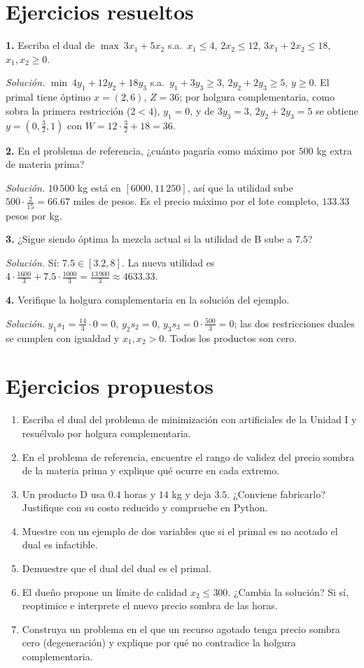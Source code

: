 \documentclass[a4paper,11pt]{article}
\theoremstyle{plain}
\theoremstyle{definition}
\newcommand{\fr}[2]{\tfrac{#1}{#2}}
\begin{document}
\section{Ejercicios resueltos}

\textbf{1.} Escriba el dual de $\max\ 3x_1+5x_2$ s.a.\ $x_1\le4$, $2x_2\le12$, $3x_1+2x_2\le18$, $x_1,x_2\ge0$.

\emph{Solución.} $\min\ 4y_1+12y_2+18y_3$ s.a.\ $y_1+3y_3\ge3$, $2y_2+2y_3\ge5$, $y\ge0$. El primal tiene
óptimo $x=(2,6)$, $Z=36$; por holgura complementaria, como sobra la primera restricción ($2<4$), $y_1=0$, y
de $3y_3=3$, $2y_2+2y_3=5$ se obtiene $y=(0,\fr32,1)$ con $W=12\cdot\fr32+18=36$.

\textbf{2.} En el problema de referencia, ¿cuánto pagaría como máximo por $500$ kg extra de materia prima?

\emph{Solución.} $10\,500$ kg está en $[6000,11\,250]$, así que la utilidad sube $500\cdot\fr2{15}=66.67$ miles de
pesos. Es el precio máximo por el lote completo, $133.33$ pesos por kg.

\textbf{3.} ¿Sigue siendo óptima la mezcla actual si la utilidad de B sube a $7.5$?

\emph{Solución.} Sí: $7.5\in[3.2,8]$. La nueva utilidad es $4\cdot\fr{1600}3+7.5\cdot\fr{1000}3=\fr{13\,900}3\approx4633.33$.

\textbf{4.} Verifique la holgura complementaria en la solución del ejemplo.

\emph{Solución.} $y_1s_1=\fr{14}3\cdot0=0$, $y_2s_2=0$, $y_3s_3=0\cdot\fr{500}3=0$; las dos restricciones duales
se cumplen con igualdad y $x_1,x_2>0$. Todos los productos son cero.

\section{Ejercicios propuestos}
\begin{enumerate}
\item Escriba el dual del problema de minimización con artificiales de la Unidad I y resuélvalo por holgura complementaria.
\item En el problema de referencia, encuentre el rango de validez del precio sombra de la materia prima y explique qué ocurre en cada extremo.
\item Un producto D usa $0.4$ horas y $14$ kg y deja $3.5$. ¿Conviene fabricarlo? Justifique con su costo reducido y compruebe en Python.
\item Muestre con un ejemplo de dos variables que si el primal es no acotado el dual es infactible.
\item Demuestre que el dual del dual es el primal.
\item El dueño propone un límite de calidad $x_2\le300$. ¿Cambia la solución? Si sí, reoptimice e interprete el nuevo precio sombra de las horas.
\item Construya un problema en el que un recurso agotado tenga precio sombra cero (degeneración) y explique por qué no contradice la holgura complementaria.
\end{enumerate}
\end{document}
